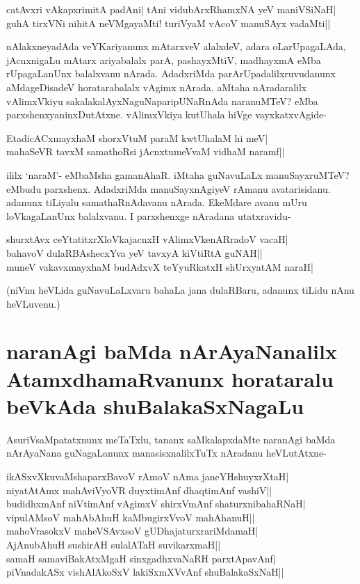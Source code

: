 \begin{shloka} 
catAvxri vAkapxrimitA padAni| tAni vidubArxRhamxNA yeV maniVSiNaH|\label{153b}\\ 
guhA tirxVNi nihitA neVMgayaMti! turiVyaM vAcoV manuSAyx  vadaMti||
\end{shloka} 

nAlakxneyadAda veYKariyanunx mAtarxveV alalxdeV, adara oLarUpagaLAda, jAcnxnigaLu mAtarx ariyabalalx parA, pashayxMtiV, madhayxmA eMba rUpagaLanUnx balalxvanu nArada. AdadxriMda parArUpadalilxruvudanunx aMdageDisadeV horatarabalalx vAgimx nArada. aMtaha nAradaralilx vAlimxVkiyu sakalakalAyxNaguNaparipUNaRnAda naranuMTeV? eMba parxshenxyaninxDutAtxne. vAlimxVkiya kutUhala hiVge vayxkatxvAgide- 

\begin{shloka} 
EtadicACxmayxhaM shorxVtuM paraM kwtUhalaM hi meV|\label{153a}\\ 
mahaSeVR tavxM samathoR\s si jAcnxtumeVvaM vidhaM naramf||
\end{shloka} 

ililx `naraM'- eMbaMsha gamanAhaR. iMtaha guNavuLaLx manuSayxruMTeV? eMbudu parxshenx. AdadxriMda manuSayxnAgiyeV rAmanu avatarisidanu. adanunx tiLiyalu samathaRnAdavanu nArada. EkeMdare avanu mUru loVkagaLanUnx balalxvanu. I parxshenxge nAradana utatxravidu- 

\begin{shloka} 
shurxtAvx ceYtatitxrXloVkajacnxH vAlimxVkenARradoV vacaH|\label{153c}\\ 
bahavoV dulaRBAshecxYva yeV tavxyA kiVtiRtA guNAH||\\ 
muneV vakavxmayxhaM budAdxvX teYyuRkatxH shUrxyatAM naraH|
\end{shloka} 

(niVnu heVLida guNavuLaLxvaru bahaLa jana dulaRBaru, adanunx tiLidu nAnu heVLuvenu.) 

\section*{naranAgi baMda nArAyaNanalilx AtamxdhamaRvanunx horataralu beVkAda shuBalakaSxNagaLu} 

AsuriVsaMpatatxnunx meTaTxlu, tananx saMkalapxdaMte naranAgi baMda nArAyaNana guNagaLanunx manasisxnalilxTuTx nAradanu heVLutAtxne- 

\begin{shloka} 
ikASxvXkuvaMshaparxBavoV rAmoV nAma janeYHshuyxrXtaH|\label{154}\\ 
niyatAtAmx mahAviVyoVR duyxtimAnf dhaqtimAnf vashiV||\\ 
budidhxmAnf niVtimAnf vAgimxV shirxVmAnf shaturxnibahaRNaH|\\ 
vipulAMsoV mahAbAhuH kaMbugirxVvoV mahAhanuH||\\ 
mahoVrasokxV maheVSAvxsoV gUDhajaturxrariMdamaH|\\ 
AjAnubAhuH sushirAH sulalATaH suvikarxmaH||\\ 
samaH samaviBakAtxMgaH sinxgadhxvaNaRH parxtApavAnf|\\ 
piVnadakASx vishAlAkoSxV lakiSxmXVvAnf shuBalakaSxNaH||
\end{shloka} 

